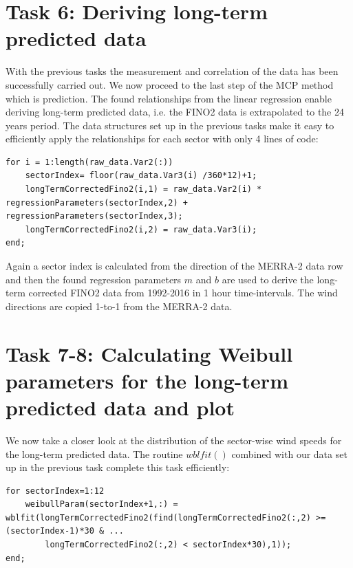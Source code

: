 \documentclass[10pt]{article}
\begin{document}
\section{Task 6: Deriving long-term predicted data}
With the previous tasks the measurement and correlation of the data has been successfully carried out. We now proceed to the last step of the MCP method which is prediction. The found relationships from the linear regression enable deriving long-term predicted data, i.e. the FINO2 data is extrapolated to the 24 years period. The data structures set up in the previous tasks make it easy to efficiently apply the relationships for each sector with only 4 lines of code:
\begin{lstlisting}
for i = 1:length(raw_data.Var2(:))
    sectorIndex= floor(raw_data.Var3(i) /360*12)+1;
    longTermCorrectedFino2(i,1) = raw_data.Var2(i) * regressionParameters(sectorIndex,2) + regressionParameters(sectorIndex,3);
    longTermCorrectedFino2(i,2) = raw_data.Var3(i);
end;
\end{lstlisting} 
Again a sector index is calculated from the direction of the MERRA-2 data row and then the found regression parameters $m$ and $b$ are used to derive the long-term corrected FINO2 data from 1992-2016 in 1 hour time-intervals. The wind directions are copied 1-to-1 from the MERRA-2 data.

\section{Task 7-8: Calculating Weibull parameters for the long-term predicted data and plot}
We now take a closer look at the distribution of the sector-wise wind speeds for the long-term predicted data. The routine $wblfit()$ combined with our data set up in the previous task complete this task efficiently:
\begin{lstlisting}
for sectorIndex=1:12
    weibullParam(sectorIndex+1,:) = wblfit(longTermCorrectedFino2(find(longTermCorrectedFino2(:,2) >= (sectorIndex-1)*30 & ... 
        longTermCorrectedFino2(:,2) < sectorIndex*30),1));
end;
\end{lstlisting} 
\end{document}
